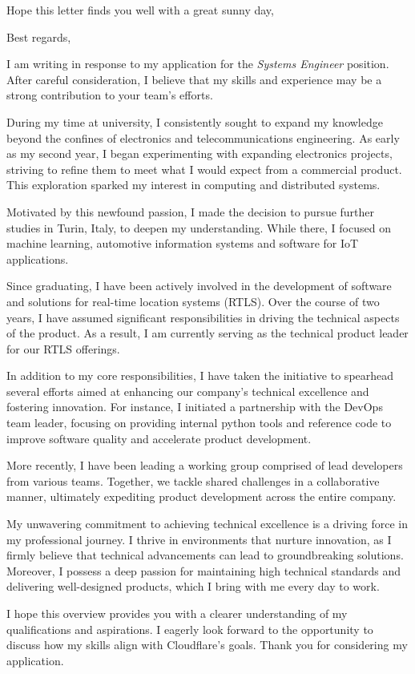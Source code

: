 \documentclass[11pt,a4paper,roman]{moderncv}
\begin{document}
\date{\today}
\opening{Hope this letter finds you well with a great sunny day,}
\closing{Best regards,}
\makelettertitle

I am writing in response to my application for the \emph{Systems Engineer} position. After careful consideration, I believe that my skills and experience may be a strong contribution to your team's efforts.

During my time at university, I consistently sought to expand my knowledge beyond the confines of electronics and telecommunications engineering. As early as my second year, I began experimenting with expanding electronics projects, striving to refine them to meet what I would expect from a commercial product. This exploration sparked my interest in computing and distributed systems.

Motivated by this newfound passion, I made the decision to pursue further studies in Turin, Italy, to deepen my understanding. While there, I focused on machine learning, automotive information systems and software for IoT applications.

Since graduating, I have been actively involved in the development of software and solutions for real-time location systems (RTLS). Over the course of two years, I have assumed significant responsibilities in driving the technical aspects of the product. As a result, I am currently serving as the technical product leader for our RTLS offerings.

In addition to my core responsibilities, I have taken the initiative to spearhead several efforts aimed at enhancing our company's technical excellence and fostering innovation. For instance, I initiated a partnership with the DevOps team leader, focusing on providing internal python tools and reference code to improve software quality and accelerate product development.

More recently, I have been leading a working group comprised of lead developers from various teams. Together, we tackle shared challenges in a collaborative manner, ultimately expediting product development across the entire company.

My unwavering commitment to achieving technical excellence is a driving force in my professional journey. I thrive in environments that nurture innovation, as I firmly believe that technical advancements can lead to groundbreaking solutions. Moreover, I possess a deep passion for maintaining high technical standards and delivering well-designed products, which I bring with me every day to work.

I hope this overview provides you with a clearer understanding of my qualifications and aspirations. I eagerly look forward to the opportunity to discuss how my skills align with Cloudflare's goals. Thank you for considering my application.

\vspace{0.5cm}

\makeletterclosing
\end{document}
